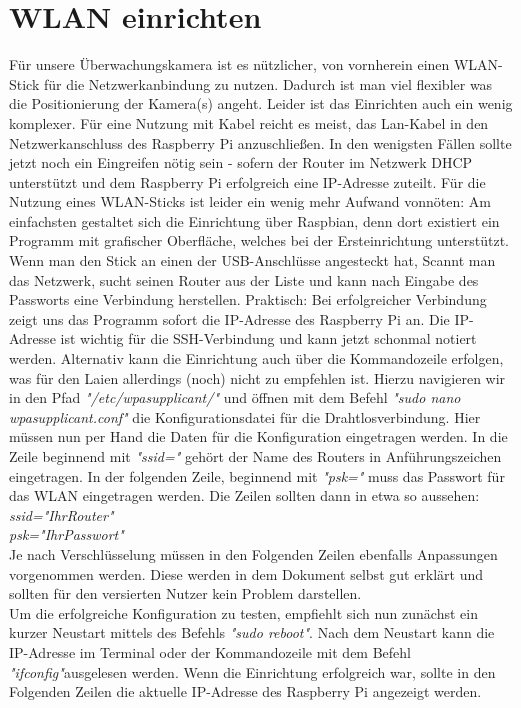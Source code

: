 \documentclass[12pt,a4paper]{scrreprt}
\begin{document}
\section{WLAN einrichten}
Für unsere Überwachungskamera ist es nützlicher, von vornherein einen WLAN-Stick für die Netzwerkanbindung zu nutzen. Dadurch ist man viel flexibler was die Positionierung der Kamera(s) angeht. Leider ist das Einrichten auch ein wenig komplexer. Für eine Nutzung mit Kabel reicht es meist, das Lan-Kabel in den Netzwerkanschluss des Raspberry Pi anzuschließen. In den wenigsten Fällen sollte jetzt noch ein Eingreifen nötig sein - sofern der Router im Netzwerk DHCP unterstützt und dem Raspberry Pi erfolgreich eine IP-Adresse zuteilt. Für die Nutzung eines WLAN-Sticks ist leider ein wenig mehr Aufwand vonnöten: Am einfachsten gestaltet sich die Einrichtung über Raspbian, denn dort existiert ein Programm mit grafischer Oberfläche, welches bei der Ersteinrichtung unterstützt.  Wenn man den Stick an einen der USB-Anschlüsse angesteckt hat, Scannt man das Netzwerk, sucht seinen Router aus der Liste und kann nach Eingabe des Passworts eine Verbindung herstellen. Praktisch: Bei erfolgreicher Verbindung zeigt uns das Programm sofort die IP-Adresse des Raspberry Pi an. Die IP-Adresse ist wichtig für die SSH-Verbindung und kann jetzt schonmal notiert werden. Alternativ kann die Einrichtung auch über die Kommandozeile erfolgen, was für den Laien allerdings (noch) nicht zu empfehlen ist. Hierzu navigieren wir in den Pfad \textit{"/etc/wpasupplicant/"} und öffnen mit dem Befehl \textit{"sudo nano wpasupplicant.conf"} die Konfigurationsdatei für die Drahtlosverbindung. Hier müssen nun per Hand die Daten für die Konfiguration eingetragen werden. In die Zeile beginnend mit \textit{"ssid="} gehört der Name des Routers in Anführungszeichen eingetragen. In der folgenden Zeile, beginnend mit \textit{"psk="} muss das Passwort für das WLAN eingetragen werden. Die Zeilen sollten dann in etwa so aussehen: \\ \textit{ssid="IhrRouter"\\psk="IhrPasswort"}\\ Je nach Verschlüsselung müssen in den Folgenden Zeilen ebenfalls Anpassungen vorgenommen werden. Diese werden in dem Dokument selbst gut erklärt und sollten für den versierten Nutzer kein Problem darstellen.\\ Um die erfolgreiche Konfiguration zu testen, empfiehlt sich nun zunächst ein kurzer Neustart mittels des Befehls \textit{"sudo reboot"}. Nach dem Neustart kann die IP-Adresse im Terminal oder der Kommandozeile mit dem Befehl \textit{"ifconfig"}ausgelesen werden. Wenn die Einrichtung erfolgreich war, sollte in den Folgenden Zeilen die aktuelle IP-Adresse des Raspberry Pi angezeigt werden.
\end{document}
